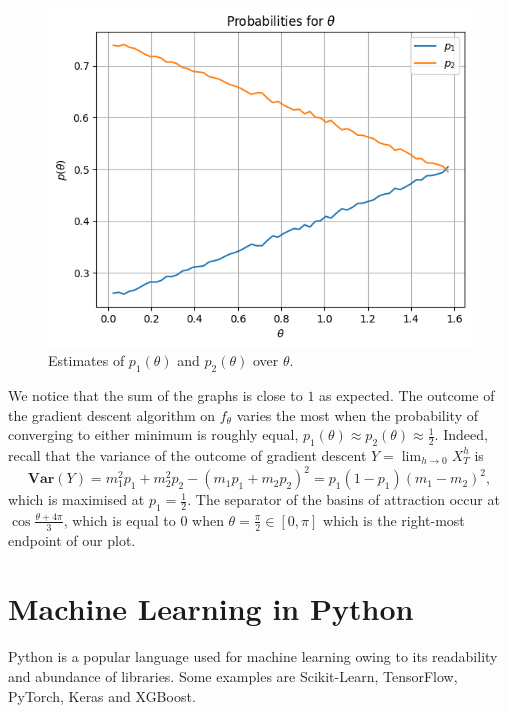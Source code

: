 \documentclass{article}
\begin{document}
\begin{figure}
    \centering
    \includegraphics[width=1.0\linewidth]{images/probabilities.png}
    \caption{Estimates of \(p_1(\theta)\) and \(p_2(\theta)\) over \(\theta\).}
\end{figure}

We notice that the sum of the graphs is close to \(1\) as expected. The outcome of the gradient descent algorithm on \(f_\theta\) varies the most when the probability of converging to either minimum is roughly equal, \(p_1(\theta) \approx p_2(\theta) \approx \frac{1}{2}\). Indeed, recall that the variance of the outcome of gradient descent \(Y = \lim_{h\to 0} X_T^h\) is
\[ \mathbf{Var}(Y) = m_1^2p_1 + m_2^2p_2 - (m_1p_1 + m_2p_2)^2=  p_1(1-p_1)(m_1-m_2)^2, \]
which is maximised at \(p_1 = \frac{1}{2}\). The separator of the basins of attraction occur at \(\cos\frac{\theta + 4\pi}{3}\), which is equal to \(0\) when \(\theta = \frac{\pi}{2} \in [0, \pi]\) which is the right-most endpoint of our plot.

\section{Machine Learning in Python}

Python is a popular language used for machine learning owing to its readability and abundance of libraries. Some examples are Scikit-Learn, TensorFlow, PyTorch, Keras and XGBoost.
\end{document}

